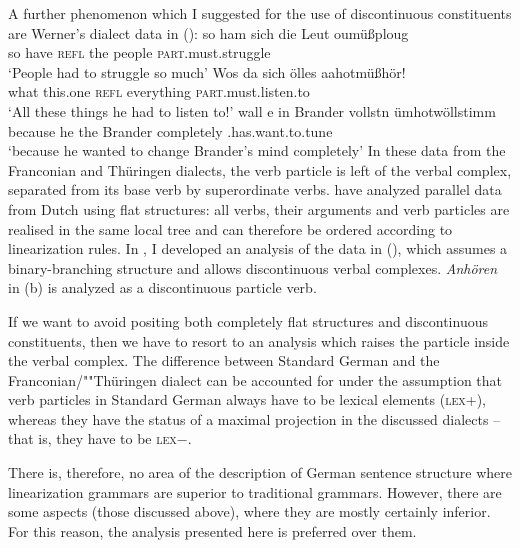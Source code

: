 A further phenomenon which I suggested for the use of discontinuous constituents are 
Werner's dialect data \citep[, 355]{Werner94a} in ():
\eal
\label{bsp-sonneberg-partikel-modal}
\ex{}
\gll so ham  sich die Leut  oumüßploug\label{bsp-abmussplagen}\\
    so have  \textsc{refl} the people \textsc{part}.must.struggle\\
\glt `People had to struggle so much'
\ex{}
\gll Wos  da       sich          ölles       aahotmüßhör!\\
     what this.one \textsc{refl} everything  \textsc{part}.must.listen.to\\
\glt `All these things he had to listen to!'
\ex
\gll wall    e  in  Brander vollstn    ümhotwöllstimm\\
    because he the Brander completely \partic.has.want.to.tune\\
\glt `because he wanted to change Brander's mind completely'
\zl
In these data from the Franconian and Thüringen dialects, the verb particle is left of
the verbal complex, separated from its base verb by superordinate verbs. \citet{BvN98} have analyzed
parallel data from Dutch using flat structures: all verbs, their arguments and verb particles are 
realised in the same local tree and can therefore be ordered according to linearization rules. In
, I developed an analysis of the data in (), which assumes a binary-branching
structure and allows discontinuous verbal complexes. \emph{Anhören} in (b) is analyzed as a discontinuous 
particle verb.

If we want to avoid positing both completely flat structures and discontinuous constituents,
then we have to resort to an analysis which raises the particle inside the verbal complex.
The difference between Standard German and the Franconian/""Thüringen dialect can be accounted
for under the assumption that verb particles in Standard German always have to be lexical
elements (\textsc{lex}+), whereas they have the status of a maximal projection in the discussed
dialects -- that is, they have to be \textsc{lex}$-$.

There is, therefore, no area of the description of German sentence structure where linearization
grammars are superior to traditional grammars. However, there are some aspects (those discussed above), 
where they are mostly certainly inferior. For this reason, the analysis presented here is preferred
over them. 


